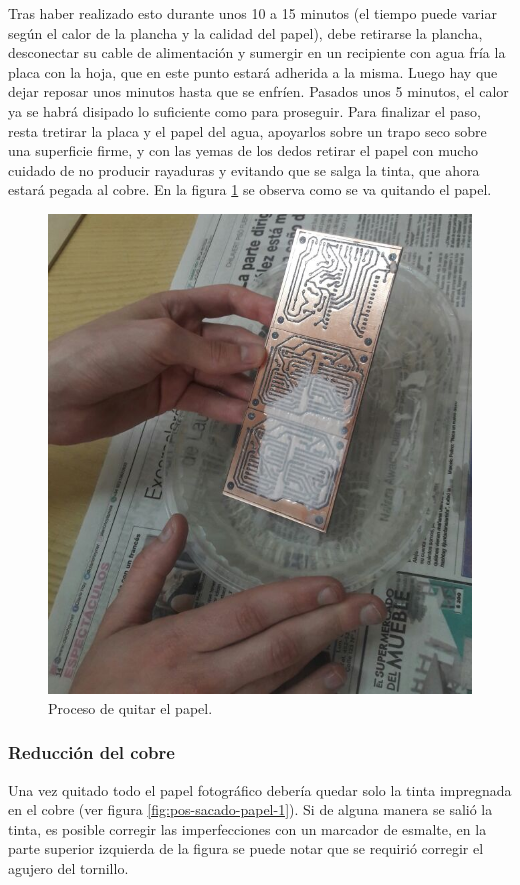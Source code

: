 Tras haber realizado esto durante unos 10 a 15 minutos (el tiempo puede variar según el calor de la plancha y la calidad del papel), debe retirarse la plancha, desconectar su cable de alimentación y sumergir en un recipiente con agua fría la placa con la hoja, que en este punto estará adherida a la misma. Luego hay que dejar reposar unos minutos hasta que se enfríen. Pasados unos 5 minutos, el calor ya se habrá disipado lo suficiente como para proseguir. Para finalizar el paso, resta tretirar la placa y el papel del agua, apoyarlos sobre un trapo seco sobre una superficie firme, y con las yemas de los dedos retirar el papel con mucho cuidado de no producir rayaduras y evitando que se salga la tinta, que ahora estará pegada al cobre.
En la figura \ref{fig:sacado-papel} se observa como se va quitando el papel.

\begin{figure}[ht!]
	\centering
	\includegraphics[width=0.6\linewidth]{imagenes/pcbeando/sacado-papel-1.png}
	\caption{Proceso de quitar el papel.}
	\label{fig:sacado-papel}
\end{figure}

\subsubsection{Reducción del cobre}
Una vez quitado todo el papel fotográfico debería quedar solo la tinta impregnada en el cobre (ver figura \ref{fig:pos-sacado-papel-1}). Si de alguna manera se salió la tinta, es posible corregir las imperfecciones con un marcador de esmalte, en la parte superior izquierda de la figura se puede notar que se requirió corregir el agujero del tornillo.

